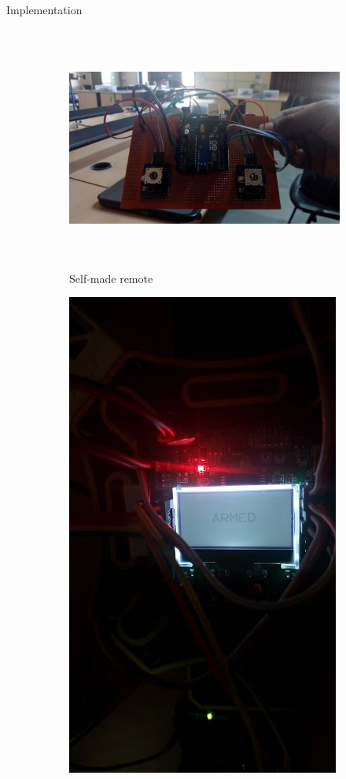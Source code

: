 \documentclass[12pt, oneside]{report}
\numberwithin{equation}{section}
\begin{document}
\begin{chapter}{Implementation}
\begin{figure}[h]
\center
\begin{subfigure}[hb]{0.3\textwidth}
\includegraphics[width=\textwidth, height=8cm]{remote}
\caption{Self-made remote}
\end{subfigure}
\begin{subfigure}[hb]{0.3\textwidth}
\includegraphics[width=\textwidth]{armed}

\end{subfigure}
\end{figure}
\end{chapter}
\end{document}
